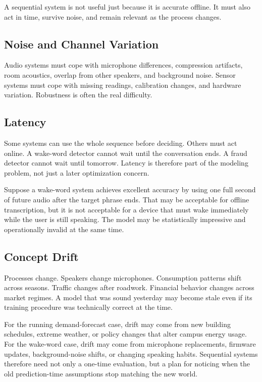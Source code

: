 A sequential system is not useful just because it is accurate offline. It must also act in time, survive noise, and remain relevant as the process changes.

\subsection{Noise and Channel Variation}

Audio systems must cope with microphone differences, compression artifacts, room acoustics, overlap from other speakers, and background noise. Sensor systems must cope with missing readings, calibration changes, and hardware variation. Robustness is often the real difficulty.

\subsection{Latency}

Some systems can use the whole sequence before deciding. Others must act online. A wake-word detector cannot wait until the conversation ends. A fraud detector cannot wait until tomorrow. Latency is therefore part of the modeling problem, not just a later optimization concern.

\begin{example}
Suppose a wake-word system achieves excellent accuracy by using one full second of future audio after the target phrase ends. That may be acceptable for offline transcription, but it is not acceptable for a device that must wake immediately while the user is still speaking. The model may be statistically impressive and operationally invalid at the same time.
\end{example}

\subsection{Concept Drift}

Processes change. Speakers change microphones. Consumption patterns shift across seasons. Traffic changes after roadwork. Financial behavior changes across market regimes. A model that was sound yesterday may become stale even if its training procedure was technically correct at the time.

For the running demand-forecast case, drift may come from new building schedules, extreme weather, or policy changes that alter campus energy usage. For the wake-word case, drift may come from microphone replacements, firmware updates, background-noise shifts, or changing speaking habits. Sequential systems therefore need not only a one-time evaluation, but a plan for noticing when the old prediction-time assumptions stop matching the new world.


